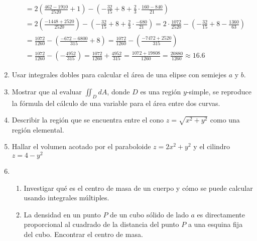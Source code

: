 \documentclass{article}
\begin{document}
\begin{enumerate}
{\begin{align*}
			&= 2(\frac{462 - 1910}{2520} + 1) - (-\frac{32}{15} + 8 + \frac{2}{3} \cdot \frac{160-840}{21})\\
			&= 2(\frac{-1448 + 2520}{2520}) - (-\frac{32}{15} + 8 + \frac{2}{3} \cdot \frac{-680}{21}) = 2 \cdot \frac{1072}{2520} - (-\frac{32}{15} + 8 - \frac{1360}{63})\\
			&= \frac{1072}{1260} - (\frac{-672-6800}{315} + 8) = \frac{1072}{1260} - (\frac{-7472+2520}{315})\\
			&= \frac{1072}{1260} - (-\frac{4952}{315}) = \frac{1072}{1260} + \frac{4952}{315} = \frac{1072+19808}{1260} = \frac{20880}{1260} \approx 16.6
		\end{align*}

	}

   \item {
   Usar integrales dobles para calcular el área de una elipse con semiejes $a$ y $b$.\\

	}

   \item {
   Mostrar que al evaluar $\iint_DdA$, donde $D$ es una región $y$-simple, se reproduce la fórmula del cálculo de una variable para el área entre dos curvas.\\



    }

   \item {
   Describir la región que se encuentra entre el cono $z = \sqrt{x^2 + y^2}$ como una región elemental.\\


    }

   \item {
   Hallar el volumen acotado por el paraboloide $z = 2x^2 + y^2$ y el cilindro $z = 4 - y^2$\\


    }

   \item {
    \begin{enumerate}
	\item
	Investigar qué es el centro de masa de un cuerpo y cómo se puede calcular usando integrales múltiples.\\


	\item
	La densidad en un punto $P$ de un cubo sólido de lado $a$ es directamente proporcional al cuadrado de la distancia del punto $P$ a una esquina fija del cubo. Encontrar el centro de masa.\\

    \end{enumerate}
    }

\end{enumerate}
\end{document}
